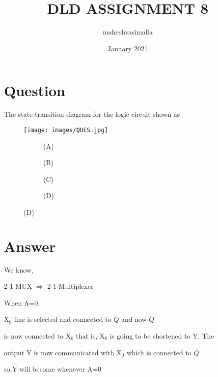\documentclass[standalone]{article}
\title{ DLD ASSIGNMENT 8}
\author{maheshvasimalla }
\date{January 2021}
\begin{document}
\maketitle

\section{Question}
       The state transition diagram for the logic circuit shown as
\begin{figure}[h]
    \centering
    \texttt{[image: images/QUES.jpg]}
\end{figure}

\begin{figure}[H]
    \centering
    \begin{subfigure}[h]{0.4\textwidth}
        \scalebox{0.7}{ }
        \caption{(A)}
    \end{subfigure}
    \hfill
    \begin{subfigure}[h]{0.4\textwidth}
        \scalebox{0.7}{ }
        \caption{(B)}
    \end{subfigure}
    \hfill
    \begin{subfigure}[h]{0.4\textwidth}
        \scalebox{0.7}{ }
        \caption{(C)}
    \end{subfigure}
    \hfill    
     \begin{subfigure}[h]{0.4\textwidth}
        \scalebox{0.7}{ }
        \caption{(D)}
    \end{subfigure}
\end{figure}

\section{ Answer}

    We know,
  
  2-1 MUX $\Longrightarrow$ 2-1 Multiplexer
  
  When   A=0,
  
  X$_0$   line  is  selected  and  connected  to $\overline{Q}$  and now  $\overline{Q}$
 
 is  now  connected  to  X$_0$  that  is,  X$_0$  is  going  to  be   shortened to  Y.  The
 
 output  Y  is  now  communicated  with  X$_0$  which  is  connected  to $\overline{Q}$.
  
  so,Y will become  whenever A=0
  
\end{document}
